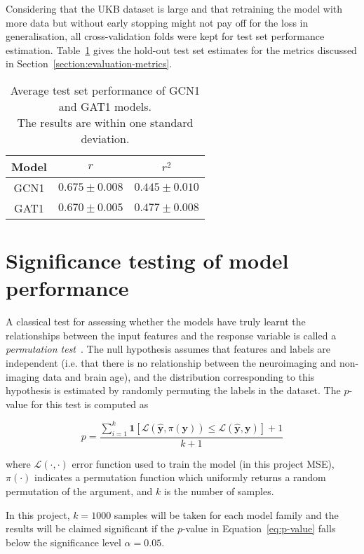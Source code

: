 Considering that the UKB dataset is large and that retraining the model with more data but without early stopping might not pay off for the loss in generalisation, all cross-validation folds were kept for test set performance estimation. Table~\ref{table:test-performance} gives the hold-out test set estimates for the metrics discussed in Section~\ref{section:evaluation-metrics}.

\begin{table}[h]
    \caption{Average test set performance of GCN1 and GAT1 models. \\ The results are within one standard deviation.}\label{table:test-performance}
    \centering
    \small
    \begin{tabular}{ccc}
        \hline
    \textbf{Model} & $r$ & $r^2$ \\  \hline
        GCN1 & $0.675 \pm 0.008$ & $0.445 \pm 0.010$ \\
        GAT1 & $0.670 \pm 0.005$ & $0.477 \pm 0.008$ \\ \hline
\end{tabular}
\end{table}


\section{Significance testing of model performance}
A classical test for assessing whether the models have truly learnt the relationships between the input features and the response variable is called a \textit{permutation test}~\cite{ojala2010permutation}. The null hypothesis assumes that features and labels are independent (i.e. that there is no relationship between the neuroimaging and non-imaging data and brain age), and the distribution corresponding to this hypothesis is estimated by randomly permuting the labels in the dataset. The $p$-value for this test is computed as

\begin{equation}
    p = \frac{\sum_{i=1}^k \mathbf{1}\left[\mathcal{L}(\mathbf{\hat{y}}, \pi(\mathbf{y})) \leq \mathcal{L}(\mathbf{\hat{y}}, \mathbf{y})\right] + 1}{k+1}\label{eq:p-value}
\end{equation}

where $\mathcal{L}(\cdot, \cdot)$ error function used to train the model (in this project MSE), $\pi(\cdot)$ indicates a permutation function which uniformly returns a random permutation of the argument, and $k$ is the number of samples.

In this project, $k=1000$ samples will be taken for each model family and the results will be claimed significant if the $p$-value in Equation~\eqref{eq:p-value} falls below the significance level $\alpha=0.05$. 

